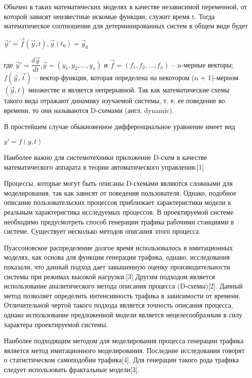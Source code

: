  Обычно в таких математических моделях в качестве независимой переменной, от которой зависят неизвестные искомые функции, служит время t. Тогда математическое соотношение для детерминированных систем в общем виде будет

 \begin{center}
    $\vec{y}'= \vec{f}(\vec{y}, t), \vec{y}(t_{0}) = \vec{y}_{0}$
 \end{center}

 где $\vec{y}' = \dfrac{d\vec{y}}{dt}$,$\vec{y} = (y_{1}, y_{2}, ... , y_{n})$ и $\vec{f} = (f_{1}, f_{2}, ... , f_{n})$ -- n-мерные векторы;$f(\vec{y}, \vec{t})$ -- вектор-функция, которая определена на некотором (n + 1)-мерном $(\vec{y}, t)$ множестве и является непрерывной. Так как математические схемы такого вида отражают динамику изучаемой системы, т. е. ее поведение во времени, то они называются D-схемами (англ. dynamic).

 В простейшем случае обыкновенное дифференциальное уравнение имеет вид

  \begin{center}
    $y' = f(y, t)$
  \end{center}
 Наиболее важно для системотехники приложение D-схем в качестве математического аппарата в теории автоматического управления.[1]

    Процессы, которые могут быть описаны D-схемами являются сложными для моделирования, так как зависят от поведения пользователя. Однако, подобное описание пользовательских процессов приближает характеристики модели к реальным характеристика исследуемых процессов. В проектируемой системе необходимо предусмотреть способ генерации трафика рабочими станциями в системе. Существует несколько методов описания этого процесса.

    Пуассоновское распределение долгое время использовалось в имитационных моделях, как основа для функции генерации трафика, однако, исследования показали, что данный подход дает завышенную оценку производительности системы при режимах высокой нагрузки.[3] Другим подходом является использование аналитического метода описания процесса (D-схемы)[2]. Данный метод позволяет определить интенсивность трафика в зависимости от времени. Отличительной чертой такого подхода является точность описания процесса, однако использование предложенной модели является нецелесообразным в силу характера проектируемой системы.

    Наиболее подходящим методом для моделирования процесса генерации трафика является метод имитационного моделирования. Последние исследования говорят о статистическом самоподобии трафика[4]. Для генерации такого рода трафика следует использовать фрактальные модели[3].

